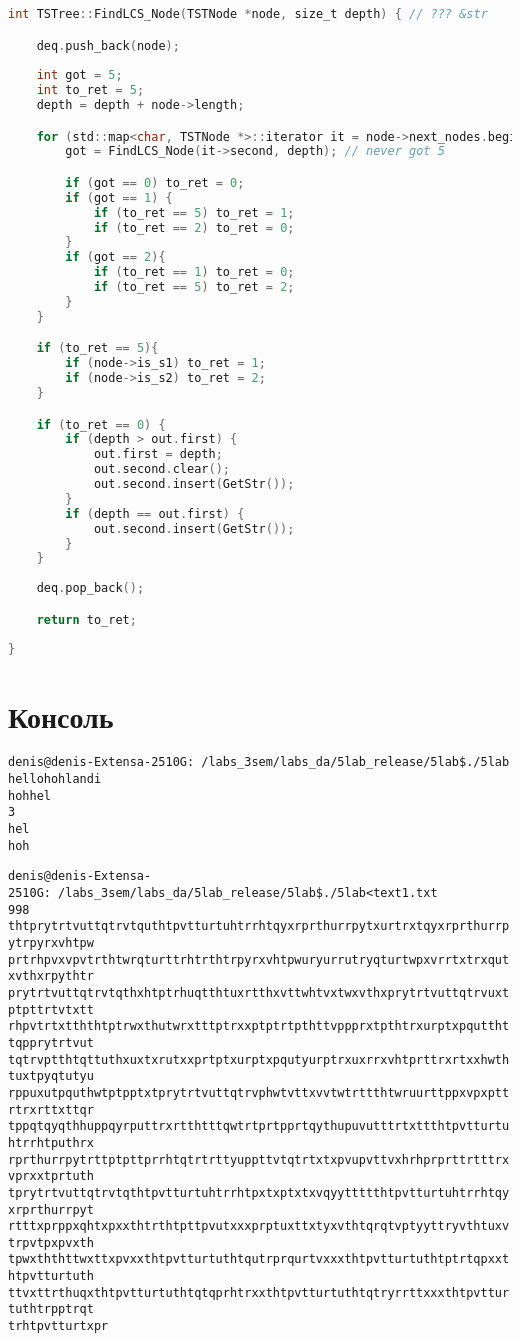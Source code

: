 \begin{lstlisting}[language=C]
int TSTree::FindLCS_Node(TSTNode *node, size_t depth) { // ??? &str

    deq.push_back(node);
    
    int got = 5;
    int to_ret = 5;
    depth = depth + node->length;

    for (std::map<char, TSTNode *>::iterator it = node->next_nodes.begin(); it != node->next_nodes.end(); ++it) {
        got = FindLCS_Node(it->second, depth); // never got 5

        if (got == 0) to_ret = 0;
        if (got == 1) {
            if (to_ret == 5) to_ret = 1;
            if (to_ret == 2) to_ret = 0;
        } 
        if (got == 2){
            if (to_ret == 1) to_ret = 0;
            if (to_ret == 5) to_ret = 2;
        }
    }

    if (to_ret == 5){
        if (node->is_s1) to_ret = 1;
        if (node->is_s2) to_ret = 2;
    }

    if (to_ret == 0) {  
        if (depth > out.first) {
            out.first = depth;
            out.second.clear();
            out.second.insert(GetStr());
        } 
        if (depth == out.first) {
            out.second.insert(GetStr());
        }
    } 
    
    deq.pop_back();

    return to_ret;
    
}

\end{lstlisting}


\pagebreak

\section{Консоль}
\begin{alltt}
denis@denis-Extensa-2510G:~/labs_3sem/labs_da/5lab_release/5lab\$ ./5lab 
hellohohlandi
hohhel
3
hel
hoh

denis@denis-Extensa-2510G:~/labs_3sem/labs_da/5lab_release/5lab\$ ./5lab < text1.txt 
998
thtprytrtvuttqtrvtquthtpvtturtuhtrrhtqyxrprthurrpytxurtrxtqyxrprthurrpytrpyrxvhtpw
prtrhpvxvpvtrthtwrqturttrhtrthtrpyrxvhtpwuryurrutryqturtwpxvrrtxtrxqutxvthxrpythtr
prytrtvuttqtrvtqthxhtptrhuqtthtuxrtthxvttwhtvxtwxvthxprytrtvuttqtrvuxtptpttrtvtxtt
rhpvtrtxtththtptrwxthutwrxtttptrxxptptrtpthttvppprxtpthtrxurptxpqutthttqpprytrtvut
tqtrvptthtqttuthxuxtxrutxxprtptxurptxpqutyurptrxuxrrxvhtprttrxrtxxhwthtuxtpyqtutyu
rppuxutpquthwtptpptxtprytrtvuttqtrvphwtvttxvvtwtrttthtwruurttppxvpxpttrtrxrttxttqr
tppqtqyqthhuppqyrputtrxrtthtttqwtrtprtpprtqythupuvutttrtxttthtpvtturtuhtrrhtputhrx
rprthurrpytrttptpttprrhtqtrtrttyuppttvtqtrtxtxpvupvttvxhrhprprttrtttrxvprxxtprtuth
tprytrtvuttqtrvtqthtpvtturtuhtrrhtpxtxptxtxvqyyttttthtpvtturtuhtrrhtqyxrprthurrpyt
rtttxprppxqhtxpxxthtrthtpttpvutxxxprptuxttxtyxvthtqrqtvptyyttryvthtuxvtrpvtpxpvxth
tpwxththttwxttxpvxxthtpvtturtuthtqutrprqurtvxxxthtpvtturtuthtptrtqpxxthtpvtturtuth
ttvxttrthuqxthtpvtturtuthtqtqprhtrxxthtpvtturtuthtqtryrrttxxxthtpvtturtuthtrpptrqt
trhtpvtturtxpr

\end{alltt}


\pagebreak

